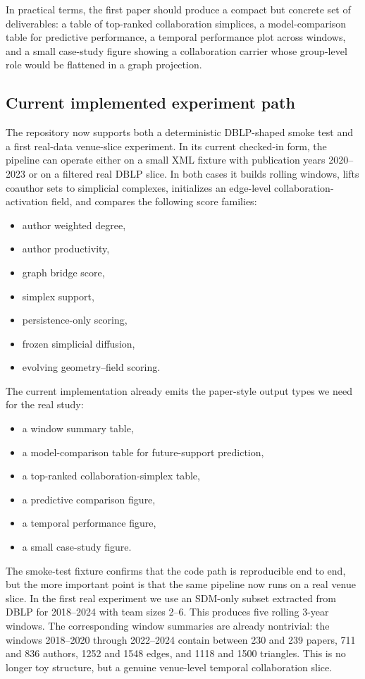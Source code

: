 \documentclass[11pt]{article}
\begin{document}
In practical terms, the first paper should produce a compact but concrete set of deliverables: a table of top-ranked collaboration simplices, a model-comparison table for predictive performance, a temporal performance plot across windows, and a small case-study figure showing a collaboration carrier whose group-level role would be flattened in a graph projection.

\subsection*{Current implemented experiment path}
The repository now supports both a deterministic DBLP-shaped smoke test and a first real-data venue-slice experiment. In its current checked-in form, the pipeline can operate either on a small XML fixture with publication years 2020--2023 or on a filtered real DBLP slice. In both cases it builds rolling windows, lifts coauthor sets to simplicial complexes, initializes an edge-level collaboration-activation field, and compares the following score families:
\begin{itemize}
    \item author weighted degree,
    \item author productivity,
    \item graph bridge score,
    \item simplex support,
    \item persistence-only scoring,
    \item frozen simplicial diffusion,
    \item evolving geometry--field scoring.
\end{itemize}

The current implementation already emits the paper-style output types we need for the real study:
\begin{itemize}
    \item a window summary table,
    \item a model-comparison table for future-support prediction,
    \item a top-ranked collaboration-simplex table,
    \item a predictive comparison figure,
    \item a temporal performance figure,
    \item a small case-study figure.
\end{itemize}

The smoke-test fixture confirms that the code path is reproducible end to end, but the more important point is that the same pipeline now runs on a real venue slice. In the first real experiment we use an SDM-only subset extracted from DBLP for 2018--2024 with team sizes 2--6. This produces five rolling 3-year windows. The corresponding window summaries are already nontrivial: the windows 2018--2020 through 2022--2024 contain between 230 and 239 papers, 711 and 836 authors, 1252 and 1548 edges, and 1118 and 1500 triangles. This is no longer toy structure, but a genuine venue-level temporal collaboration slice.
\end{document}

